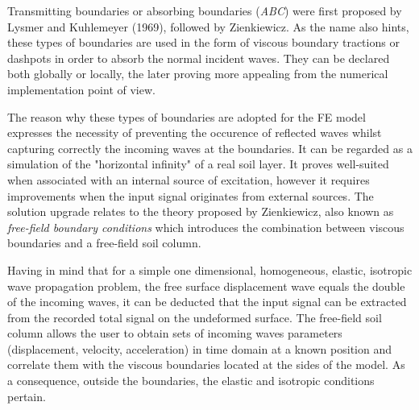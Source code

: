 	Transmitting boundaries or absorbing boundaries (\textit{ABC}) were first proposed by Lysmer and Kuhlemeyer (1969), followed by Zienkiewicz. As the name also hints, these types of boundaries are used in the form of viscous boundary tractions or dashpots in order to absorb the normal incident waves. They can be declared both globally or locally, the later proving more appealing from the numerical implementation point of view.
	
	The reason why these types of boundaries are adopted for the FE model expresses the necessity of preventing the occurence of reflected waves whilst capturing correctly the incoming waves at the boundaries. It can be regarded as a simulation of the "horizontal infinity" of a real soil layer. It proves well-suited when associated with an internal source of excitation, however it requires improvements when the input signal originates from external sources. The solution upgrade relates to the theory proposed by Zienkiewicz, also known as \textit{free-field boundary conditions} which introduces the combination between viscous boundaries and a free-field soil column.
	
	Having in mind that for a simple one dimensional, homogeneous, elastic, isotropic wave propagation problem, the free surface displacement wave equals the double of the incoming waves, it can be deducted that the input signal can be extracted from the recorded total signal on the undeformed surface. The free-field soil column allows the user to obtain sets of incoming waves parameters (displacement, velocity, acceleration) in time domain at a known position and correlate them with the viscous boundaries located at the sides of the model. As a consequence, outside the boundaries, the elastic and isotropic conditions pertain.
	 
